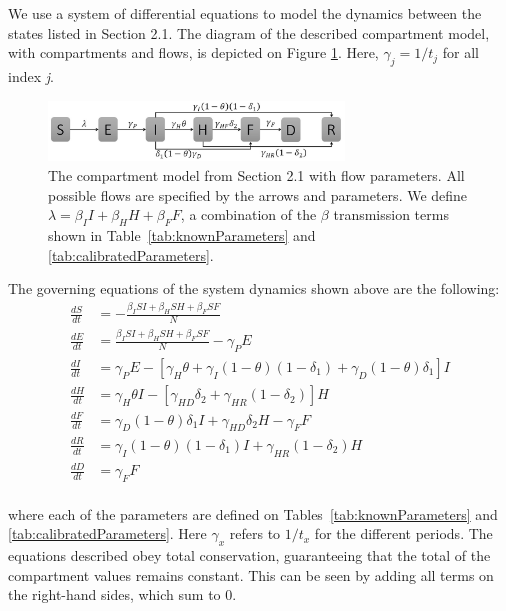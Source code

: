 We use a system of differential equations to model the dynamics between the states listed in Section 2.1. The diagram of the described compartment model, with compartments and flows, is depicted on Figure \ref{fig:compartment}. Here, $\gamma_j = 1/t_j$ for all index \textit{j}.\\


\begin{figure}[!h]
  \centering
  \includegraphics[width=0.7\textwidth]{compartment}
  \caption{The compartment model from Section 2.1 with flow parameters. All possible flows are specified by the arrows and parameters. We define $\lambda = \beta_{I}I+\beta_{H}H+\beta_{F}F $, a combination of the $\beta$ transmission terms shown in Table~\ref{tab:knownParameters} and \ref{tab:calibratedParameters}. } 
\label{fig:compartment} 
\end{figure}


The governing equations of the system dynamics shown above are the following:
\begin{align}
\frac{dS}{dt} &= - \frac{\beta_{I}SI+\beta_{H}SH+\beta_{F}SF}{N} \label{eqn:SD1}\\
\frac{dE}{dt} &=  \frac{\beta_{I}SI+\beta_{H}SH+\beta_{F}SF}{N}-\gamma_P E         \label{eqn:SD2}\\
\frac{dI}{dt} &=  \gamma_P E - [\gamma_{H}\theta + \gamma_{I}(1-\theta)(1-\delta_{1})+\gamma_{D}(1-\theta)\delta_{1}]I \label{eqn:SD3}\\
\frac{dH}{dt} &= \gamma_{H}\theta I - [\gamma_{HD}\delta_{2}+\gamma_{HR}(1-\delta_{2})]H \label{eqn:SD4}\\
\frac{dF}{dt} &= \gamma_{D}(1-\theta) \delta_{1} I + \gamma_{HD}\delta_{2} H-\gamma_{F} F  \label{eqn:SD5}\\
\frac{dR}{dt} &= \gamma_{I}(1-\theta)(1- \delta_{1}) I + \gamma_{HR}(1-\delta_{2}) H       \label{eqn:SD6}\\
\frac{dD}{dt} &= \gamma_{F} F  \label{eqn:SD7}
\end{align}\\
where each of the parameters are defined on Tables~\ref{tab:knownParameters} and \ref{tab:calibratedParameters}. Here $\gamma_x$ refers to $1/t_x$ for the different periods. The equations described obey total conservation, guaranteeing that the total of the compartment values remains constant. This can be seen by adding all terms on the right-hand sides, which sum to 0. 



